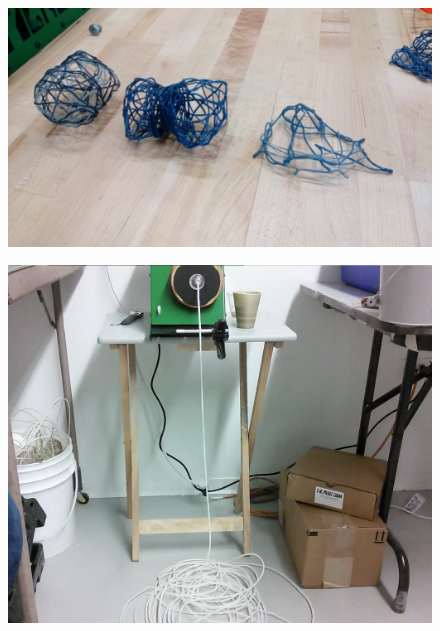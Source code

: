 \begin{figure}[h!]
\centering
\includegraphics[width=\hsize]{art/IMG_20160801_121232.jpg}
\caption{\label{fig:art_3}  }
\end{figure}

\begin{figure}[h!]
\centering
\includegraphics[width=\hsize]{art/extruding.png}
\caption{\label{fig:art_2}  }
\end{figure}

